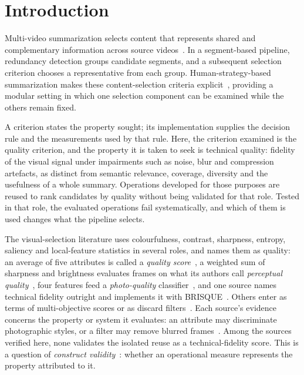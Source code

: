 \section{Introduction}\label{sec:intro}


Multi-video summarization selects content that represents shared and complementary information across source videos~\citep{apostolidis2021survey,li2010videommr,panda2017collaborative,truong2007video_abstraction,wu2020mvsgcn}. In a segment-based pipeline, redundancy detection groups candidate segments, and a subsequent selection criterion chooses a representative from each group. Human-strategy-based summarization makes these content-selection criteria explicit~\citep{barbieri2021tese,barbieri2021content}, providing a modular setting in which one selection component can be examined while the others remain fixed.

A criterion states the property sought; its implementation supplies the decision rule and the measurements used by that rule. Here, the criterion examined is the quality criterion, and the property it is taken to seek is technical quality: fidelity of the visual signal under impairments such as noise, blur and compression artefacts, as distinct from semantic relevance, coverage, diversity and the usefulness of a whole summary. Operations developed for those purposes are reused to rank candidates by quality without being validated for that role. Tested in that role, the evaluated operations fail systematically, and which of them is used changes what the pipeline selects.

The visual-selection literature uses colourfulness, contrast, sharpness, entropy, saliency and local-feature statistics in several roles, and names them as quality: an average of five attributes is called a \emph{quality score}~\citep{srinivas2016rank}, a weighted sum of sharpness and brightness evaluates frames on what its authors call \emph{perceptual quality}~\citep{korolkov2025keyframe}, four features feed a \emph{photo-quality} classifier~\citep{ke2006highlevel}, and one source names technical fidelity outright and implements it with BRISQUE~\citep{xu2024property}. Others enter as terms of multi-objective scores or as discard filters~\citep{cakmak2025tripss,gygli2014summe,huang2024aesthetic,jeong2016static,qaroush2025diversity,yang2024keyframe}. Each source's evidence concerns the property or system it evaluates: an attribute may discriminate photographic styles, or a filter may remove blurred frames~\citep{hasler2003colorfulness,ke2006highlevel}. Among the sources verified here, none validates the isolated reuse as a technical-fidelity score. This is a question of \emph{construct validity}~\citep{cronbach1955construct}: whether an operational measure represents the property attributed to it.

